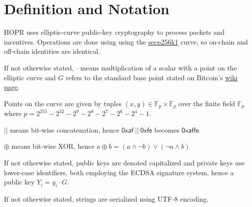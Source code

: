 \section{Definition and Notation}

HOPR uses elliptic-curve public-key cryptography to process packets and incentives. Operations are done using using the \href{https://en.bitcoin.it/wiki/Secp256k1}{secp256k1} curve, so on-chain and off-chain identities are identical.

If not otherwise stated, $\cdot$ means multiplication of a scalar with a point on the elliptic curve and $G$ refers to the standard base point stated on Bitcoin's \href{https://en.bitcoin.it/wiki/Secp256k1}{wiki page}.

Points on the curve are given by tuples $(x,y) \in \mathbb{F}_p \times \mathbb{F}_p$ over the finite field $\mathbb{F}_p$ where $p = 2^{255} - 2^{32} - 2^9 - 2^8 - 2^7 - 2^6 - 2^4 - 1$.

$ || $ means bit-wise concatenation, hence $\mathsf{0xaf} \ || \ \mathsf{0xfe}$ becomes $\mathsf{0xaffe}$.

$\oplus$ means bit-wise XOR, hence $a \oplus b = (a \land \lnot b) \lor (\lnot a \land b)$

If not otherwise stated, public keys are denoted capitalized and private keys use lower-case identifiers, both employing the ECDSA signature system, hence a public key $Y_i = y_i \cdot G$.

If not otherwise stated, strings are serialized using UTF-8 encoding.

